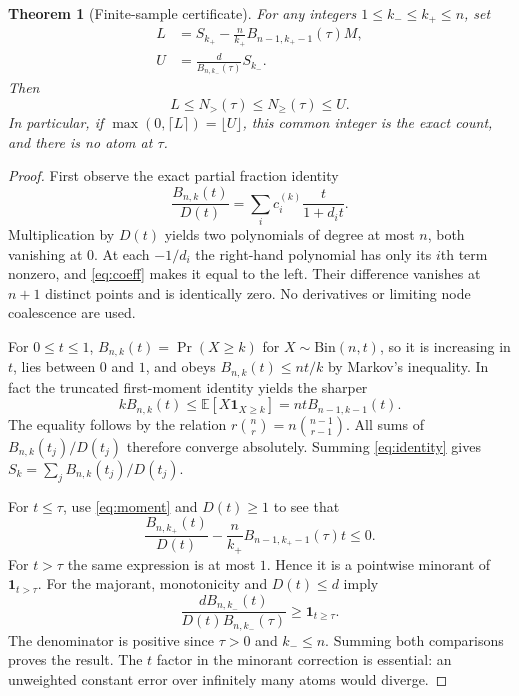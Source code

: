 \documentclass[11pt]{article}
\newtheorem{theorem}{Theorem}[section]
\theoremstyle{remark}\newtheorem{remark}[theorem]{Remark}
\newcommand{\one}{\mathbf 1}
\begin{document}
\begin{theorem}[Finite-sample certificate]\label{thm:count}
For any integers $1\le k_-\le k_+\le n$, set
\begin{equation}\label{eq:LU}
 \begin{split}
 L&=S_{k_+}-\frac{n}{k_+}B_{n-1,k_+-1}(\tau)M,\\
 U&=\frac{d}{B_{n,k_-}(\tau)}S_{k_-}.
 \end{split}
\end{equation}
Then
\[
 \boxed{\quad L\le N_>(\tau)\le N_\ge(\tau)\le U.\quad}
\]
In particular, if $\max(0,\lceil L\rceil)=\lfloor U\rfloor$, this common integer is the exact count, and there is no atom at $\tau$.
\end{theorem}
\begin{proof}
First observe the exact partial fraction identity
\begin{equation}\label{eq:identity}
 \frac{B_{n,k}(t)}{D(t)}=\sum_i c_i^{(k)}\frac{t}{1+d_it}.
\end{equation}
Multiplication by $D(t)$ yields two polynomials of degree at most $n$, both vanishing at $0$. At each $-1/d_i$ the right-hand polynomial has only its $i$th term nonzero, and \eqref{eq:coeff} makes it equal to the left. Their difference vanishes at $n+1$ distinct points and is identically zero. No derivatives or limiting node coalescence are used.

For $0\le t\le1$, $B_{n,k}(t)=\Pr(X\ge k)$ for $X\sim\mathrm{Bin}(n,t)$, so it is increasing in $t$, lies between $0$ and $1$, and obeys $B_{n,k}(t)\le nt/k$ by Markov's inequality. In fact the truncated first-moment identity yields the sharper
\begin{equation}\label{eq:moment}
 kB_{n,k}(t)\le \mathbb E[X\one_{X\ge k}]
 =nt B_{n-1,k-1}(t).
\end{equation}
The equality follows by the relation $r\binom{n}{r}=n\binom{n-1}{r-1}$. All sums of $B_{n,k}(t_j)/D(t_j)$ therefore converge absolutely. Summing \eqref{eq:identity} gives $S_k=\sum_j B_{n,k}(t_j)/D(t_j)$.

For $t\le\tau$, use \eqref{eq:moment} and $D(t)\ge1$ to see that
\[
 \frac{B_{n,k_+}(t)}{D(t)}-\frac n{k_+}B_{n-1,k_+-1}(\tau)t\le0.
\]
For $t>\tau$ the same expression is at most $1$. Hence it is a pointwise minorant of $\one_{t>\tau}$. For the majorant, monotonicity and $D(t)\le d$ imply
\[
 \frac{d B_{n,k_-}(t)}{D(t)B_{n,k_-}(\tau)}\ge\one_{t\ge\tau}.
\]
The denominator is positive since $\tau>0$ and $k_-\le n$. Summing both comparisons proves the result. The $t$ factor in the minorant correction is essential: an unweighted constant error over infinitely many atoms would diverge.
\end{proof}
\end{document}
